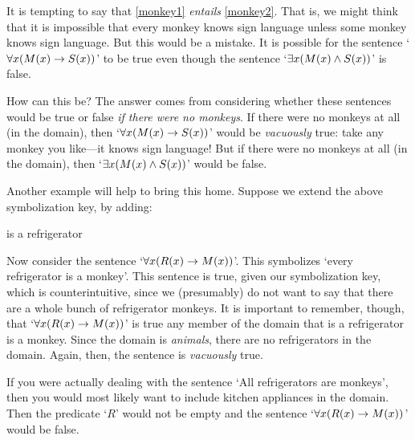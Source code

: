 It is tempting to say that \cref*{monkey1} \emph{entails} \cref*{monkey2}. That is, we might think that it is impossible that every monkey knows sign language unless some monkey knows sign language. But this would be a mistake. It is possible for the sentence `$\forall x(M(x) \rightarrow S(x))$' to be true even though the sentence `$\exists x(M(x) \wedge S(x))$' is false.

How can this be? The answer comes from considering whether these sentences would be true or false \emph{if there were no monkeys}. If there were no monkeys at all (in the domain), then `$\forall x(M(x) \rightarrow S(x))$' would be \emph{vacuously} true: take any monkey you like---it knows sign language! But if there were no monkeys at all (in the domain), then `$\exists x(M(x) \wedge S(x))$' would be false.

Another example will help to bring this home. Suppose we extend the above symbolization key, by adding:
	\begin{ekey}
		\item[\atom{R}{x}]  is a refrigerator
	\end{ekey}
Now consider the sentence `$\forall x(R(x) \rightarrow M(x))$'. This symbolizes `every refrigerator is a monkey'. This sentence is true, given our symbolization key, which is counterintuitive, since we (presumably) do not want to say that there are a whole bunch of refrigerator monkeys. It is important to remember, though, that `$\forall x(R(x) \rightarrow M(x))$' is true \ifeff{} any member of the domain that is a refrigerator is a monkey. Since the domain is \emph{animals}, there are no refrigerators in the domain. Again, then, the sentence is \emph{vacuously} true.

If you were actually dealing with the sentence `All refrigerators are monkeys', then you would most likely want to include kitchen appliances in the domain. Then the predicate `$R$' would not be empty and the sentence `$\forall x(R(x) \rightarrow M(x))$' would be false.


